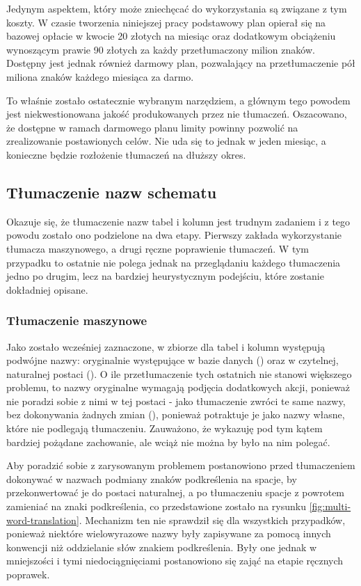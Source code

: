 Jedynym aspektem, który może zniechęcać do wykorzystania  są związane z tym koszty. W czasie tworzenia niniejszej pracy podstawowy plan opierał się na bazowej opłacie w kwocie 20 złotych na miesiąc oraz dodatkowym obciążeniu wynoszącym prawie 90 złotych za każdy przetłumaczony milion znaków. Dostępny jest jednak również darmowy plan, pozwalający na przetłumaczenie pół miliona znaków każdego miesiąca za darmo.

To właśnie  zostało ostatecznie wybranym narzędziem, a głównym tego powodem jest niekwestionowana jakość produkowanych przez nie tłumaczeń. Oszacowano, że dostępne w ramach darmowego planu limity powinny pozwolić na zrealizowanie postawionych celów. Nie uda się to jednak w jeden miesiąc, a konieczne będzie rozłożenie tłumaczeń na dłuższy okres.

\subsection{Tłumaczenie nazw schematu}
Okazuje się, że tłumaczenie nazw tabel i kolumn jest trudnym zadaniem i z tego powodu zostało ono podzielone na dwa etapy. Pierwszy zakłada wykorzystanie tłumacza maszynowego, a drugi ręczne poprawienie tłumaczeń. W tym przypadku to ostatnie nie polega jednak na przeglądaniu każdego tłumaczenia jedno po drugim, lecz na bardziej heurystycznym podejściu, które zostanie dokładniej opisane.

\subsubsection{Tłumaczenie maszynowe}
Jako zostało wcześniej zaznaczone, w zbiorze  dla tabel i kolumn występują podwójne nazwy: oryginalnie występujące w bazie danych () oraz w czytelnej, naturalnej postaci (). O ile przetłumaczenie tych ostatnich nie stanowi większego problemu, to nazwy oryginalne wymagają podjęcia dodatkowych akcji, ponieważ  nie poradzi sobie z nimi w tej postaci - jako tłumaczenie zwróci te same nazwy, bez dokonywania żadnych zmian (), ponieważ potraktuje je jako nazwy własne, które nie podlegają tłumaczeniu. Zauważono, że  wykazuję pod tym kątem bardziej pożądane zachowanie, ale wciąż nie można by było na nim polegać. 

Aby poradzić sobie z zarysowanym problemem postanowiono przed tłumaczeniem dokonywać w nazwach podmiany znaków podkreślenia na spacje, by przekonwertować je do postaci naturalnej, a po tłumaczeniu spacje z powrotem zamieniać na znaki podkreślenia, co przedstawione zostało na rysunku \ref{fig:multi-word-translation}. Mechanizm ten nie sprawdził się dla wszystkich przypadków, ponieważ niektóre wielowyrazowe nazwy były zapisywane za pomocą innych konwencji niż oddzielanie słów znakiem podkreślenia. Były one jednak w mniejszości i tymi niedociągnięciami postanowiono się zająć na etapie ręcznych poprawek.

